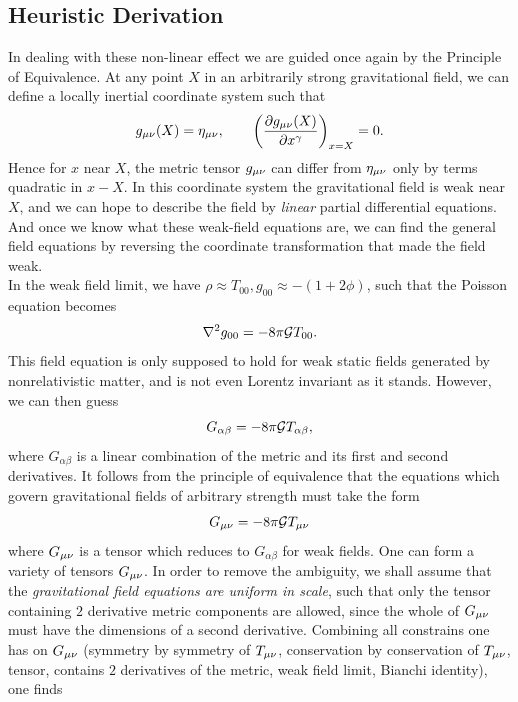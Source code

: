 \subsection{Heuristic Derivation}
In dealing with these non-linear effect we are guided once again by the Principle of Equivalence. At any point $X$ in an arbitrarily strong gravitational field, we can define a locally inertial coordinate system such that
\begin{equation}
	g_{\mu \nu}(X) = \eta_{\mu \nu}, \qquad \left(\frac{\partial g_{\mu \nu}(X)}{\partial x^\gamma}\right)_{x=X} =0.
\end{equation}
Hence for $x$ near $X$, the metric tensor $g_{\mu \nu}$ can differ from $\eta_{\mu \nu}$ only by terms quadratic in $x-X$. In this coordinate system the gravitational field is weak near $X$, and we can hope to describe the field by \emph{linear} partial differential equations. And once we know what these weak-field equations are, we can find the general field equations by reversing the coordinate transformation that made the field weak.\\
In the weak field limit, we have $\rho \approx T_{00}, g_{00} \approx -(1+2 \phi)$, such that the Poisson equation becomes
\begin{equation}
	\nabla^2 g_{00} = - 8 \pi \mathcal{G} T_{00}.
\end{equation}
This field equation is only supposed to hold for weak static fields generated by nonrelativistic matter, and is not even Lorentz invariant as it stands. However, we can then guess 
\begin{equation}
	G_{\alpha \beta} = - 8 \pi \mathcal{G} T_{\alpha \beta},
\end{equation}
where $G_{\alpha \beta}$ is a linear combination of the metric and its first and second derivatives. It follows from the principle of equivalence that the equations which govern gravitational fields of arbitrary strength must take the form
\begin{equation}
	G_{\mu \nu} = - 8 \pi \mathcal{G} T_{\mu \nu}
\end{equation}
where $G_{\mu \nu}$ is a tensor which reduces to $G_{\alpha \beta}$ for weak fields. One can form a variety of tensors $G_{\mu \nu}$. In order to remove the ambiguity, we shall assume that the \emph{gravitational field equations are uniform in scale}, such that only the tensor containing $2$ derivative metric components are allowed, since the whole of $G_{\mu \nu}$ must have the dimensions of a second derivative. Combining all constrains one has on $G_{\mu \nu}$ (symmetry by symmetry of $T_{\mu \nu}$, conservation by conservation of $T_{\mu \nu}$, tensor, contains $2$ derivatives of the metric, weak field limit, Bianchi identity), one finds

